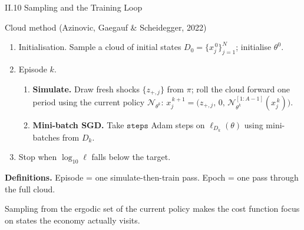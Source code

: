 \documentclass[aspectratio=169,11pt]{beamer}
\newcommand{\emphc}[1]{\textcolor{harvardcrimson}{#1}}
\newcommand{\N}{\mathcal{N}}
\newcommand{\Loss}{\ell}
\begin{document}
\begin{frame}{II.10 Sampling and the Training Loop}
\small
\begin{block}{Cloud method (Azinovic, Gaegauf \& Scheidegger, 2022)}
\vspace{-2pt}
\begin{enumerate}\itemsep2pt
    \item \emphc{Initialisation.}  Sample a cloud of initial states $D_0 = \{x_j^{\,0}\}_{j=1}^{N}$; initialise $\theta^0$.
    \item \emphc{Episode $k$.}
    \begin{enumerate}
        \item[(a)] \textbf{Simulate.}  Draw fresh shocks $\{z_{+,j}\}$ from $\pi$; roll the cloud forward one period using the \emphc{current} policy $\N_{\theta^k}$:
        $x_j^{\,k+1} = \bigl(z_{+,j},\,0,\,\N_{\theta^k}^{[1:A-1]}(x_j^{\,k})\bigr)$.
        \item[(b)] \textbf{Mini-batch SGD.}  Take $\texttt{steps}$ Adam steps on $\Loss_{D_k}(\theta)$ using mini-batches from $D_k$.
    \end{enumerate}
    \item \emphc{Stop} when $\log_{10} \Loss$ falls below the target.
\end{enumerate}
\end{block}

\vspace{0.2em}
\textbf{Definitions.}  \emphc{Episode} = one simulate-then-train pass.  \emphc{Epoch} = one pass through the full cloud.

\vspace{0.3em}
{\footnotesize Sampling from the ergodic set of the current policy makes the cost function focus on states the economy actually visits.}
\end{frame}
\end{document}
